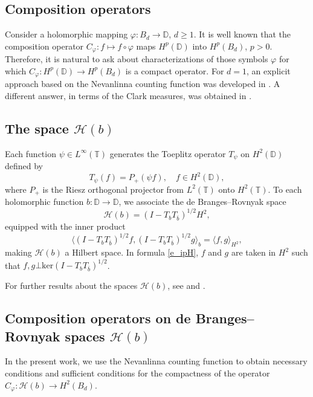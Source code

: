 \documentclass{amsart}
\numberwithin{equation}{section}
\theoremstyle{definition}
\newcommand{\bd}{{B_d}}
\newcommand{\dbr}{\mathcal{H}}
\newcommand{\ph}{\varphi}
\newcommand{\cph}{C_\varphi}
\newcommand{\Dbb}{\mathbb D}
\newcommand{\Tbb}{\mathbb T}
\newcommand{\dn}{\mathbb{D}^n}
\begin{document}
\subsection{Composition operators}
Consider a holomorphic mapping $\ph: \bd\to\Dbb$, $d\ge 1$.
It is well known that the composition operator $\cph: f\mapsto f\circ\ph$ maps $H^p(\Dbb)$
into $H^p(\bd)$, $p>0$. 
Therefore, it is natural to ask about characterizations
of those symbols $\ph$ for which
$\cph: H^p(\Dbb)\to H^p(\bd)$ is a compact operator.
For $d=1$, an explicit approach based on the Nevanlinna counting function
was developed in \cite{ShJoel87}.
A different answer, in terms of the Clark measures, was obtained in \cite{CM97}.

\subsection{The space $\dbr(b)$}
Each function $\psi \in L^\infty(\Tbb)$
generates the Toeplitz operator $T_\psi$ on $H^2(\Dbb)$
defined by
\[
T_\psi (f) = P_+ (\psi f),\quad f\in H^2(\Dbb),
\]
where $P_+$ is the Riesz orthogonal projector from $L^2(\Tbb)$ onto $H^2(\Tbb)$. 
To each holomorphic function $b: \Dbb \to \Dbb$, we associate the de Branges--Rovnyak space
\[
\dbr(b) = (I- T_b T_{\overline{b}})^{1/2} H^2,
\]
equipped with the inner product
\begin{equation}\label{e_ipH}
\langle(I- T_b T_{\overline{b}})^{1/2} f, (I- T_b T_{\overline{b}})^{1/2} g\rangle_b = \langle f, g \rangle_{H^2},
\end{equation}
making $\dbr(b)$ a Hilbert space. In formula \eqref{e_ipH}, $f$ and $g$ are taken in $H^2$ such
that $f, g \bot \mathrm{ker}(I- T_b T_{\overline{b}})^{1/2}$.

For further results about the spaces $\dbr(b)$,
see \cite{FM16} and \cite{Sa94}.

\subsection{Composition operators on de Branges--Rovnyak spaces $\dbr(b)$}
In the present work,
we use the Nevanlinna counting function 
to obtain necessary conditions and sufficient conditions
for the compactness of the operator $\cph: \dbr(b) \to H^2(\bd)$.
\end{document}
